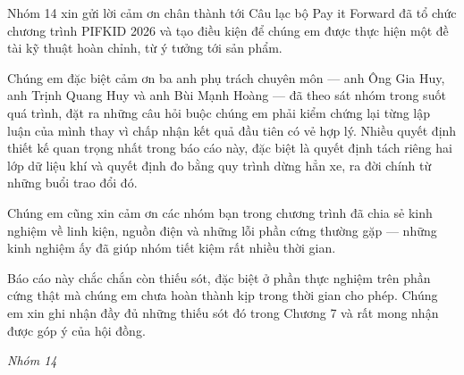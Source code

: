 Nhóm 14 xin gửi lời cảm ơn chân thành tới Câu lạc bộ Pay it Forward đã tổ chức chương trình PIFKID 2026 và tạo điều kiện để chúng em được thực hiện một đề tài kỹ thuật hoàn chỉnh, từ ý tưởng tới sản phẩm.

Chúng em đặc biệt cảm ơn ba anh phụ trách chuyên môn --- anh Ông Gia Huy, anh Trịnh Quang Huy và anh Bùi Mạnh Hoàng --- đã theo sát nhóm trong suốt quá trình, đặt ra những câu hỏi buộc chúng em phải kiểm chứng lại từng lập luận của mình thay vì chấp nhận kết quả đầu tiên có vẻ hợp lý. Nhiều quyết định thiết kế quan trọng nhất trong báo cáo này, đặc biệt là quyết định tách riêng hai lớp dữ liệu khí và quyết định đo bằng quy trình dừng hẳn xe, ra đời chính từ những buổi trao đổi đó.

Chúng em cũng xin cảm ơn các nhóm bạn trong chương trình đã chia sẻ kinh nghiệm về linh kiện, nguồn điện và những lỗi phần cứng thường gặp --- những kinh nghiệm ấy đã giúp nhóm tiết kiệm rất nhiều thời gian.

Báo cáo này chắc chắn còn thiếu sót, đặc biệt ở phần thực nghiệm trên phần cứng thật mà chúng em chưa hoàn thành kịp trong thời gian cho phép. Chúng em xin ghi nhận đầy đủ những thiếu sót đó trong Chương 7 và rất mong nhận được góp ý của hội đồng.

\noindent \textit{Nhóm 14}
